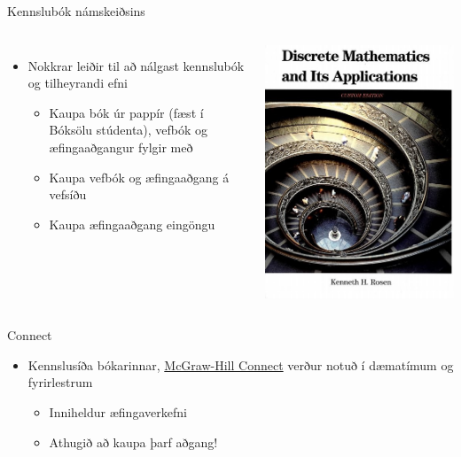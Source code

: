 \documentclass[handout]{beamer}
\begin{document}
\begin{frame}{Kennslubók námskeiðsins}
\begin{columns}
\begin{itemize}
 \item Nokkrar leiðir til að nálgast kennslubók og tilheyrandi efni
 \begin{itemize}
  \item Kaupa bók úr pappír (fæst í Bóksölu stúdenta), vefbók og æfingaaðgangur fylgir með
  \item Kaupa vefbók og æfingaaðgang á vefsíðu
  \item Kaupa æfingaaðgang eingöngu
 \end{itemize}
\end{itemize}
\begin{center}
\includegraphics[width=0.7\linewidth]{Pics/rosen}
\end{center}
\end{columns}
\end{frame}

\begin{frame}{Connect}
\begin{itemize}
 \item Kennslusíða bókarinnar, \href{http://connect.mheducation.com/class/tol104g16}{McGraw-Hill Connect} verður notuð í dæmatímum og fyrirlestrum
 \begin{itemize}
  \item Inniheldur æfingaverkefni
  \item Athugið að kaupa þarf aðgang!
 \end{itemize}
\end{itemize}
\end{frame}
\end{document}
